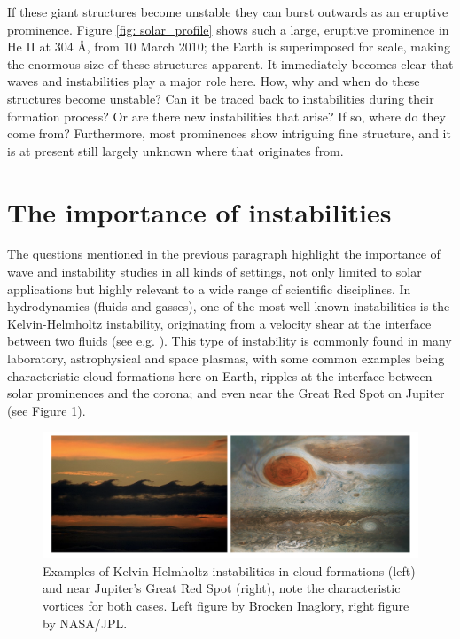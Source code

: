 If these giant structures become unstable they can burst outwards as an eruptive prominence. Figure \ref{fig: solar_profile} shows such a large, eruptive prominence in He II at 304 \AA, from 10 March 2010; the Earth is superimposed for scale, making the enormous size of these structures apparent. It immediately becomes clear that waves and instabilities play a major role here. How, why and when do these structures become unstable? Can it be traced back to instabilities during their formation process? Or are there new instabilities that arise? If so, where do they come from? Furthermore, most prominences show intriguing fine structure, and it is at present still largely unknown where that originates from.

\section{The importance of instabilities}
The questions mentioned in the previous paragraph highlight the importance of wave and instability studies in all kinds of settings, not only limited to solar applications but highly relevant to a wide range of scientific disciplines. In hydrodynamics (fluids and gasses), one of the most well-known instabilities is the Kelvin-Helmholtz instability, originating from a velocity shear at the interface between two fluids (see e.g. \citet{book_choudhuri}). This type of instability is commonly found in many laboratory, astrophysical and space plasmas, with some common examples being characteristic cloud formations here on Earth, ripples at the interface between solar prominences and the corona; and even near the Great Red Spot on Jupiter (see Figure \ref{fig: kh_instability}).

\begin{figure}[b]
  \centering
  \includegraphics[width=\textwidth]{instabilities.png}
  \caption{
    Examples of Kelvin-Helmholtz instabilities in cloud formations (left) and near Jupiter's Great Red Spot (right), note the characteristic vortices for both cases. Left figure by Brocken Inaglory, right figure by NASA/JPL.
  }
  \label{fig: kh_instability}
\end{figure}

